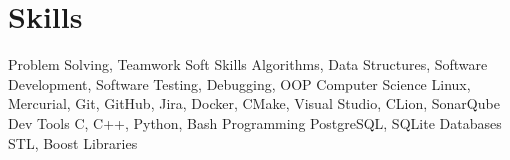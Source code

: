 \section{Skills}

\begin{itemize}
    \cventryii
        {Problem Solving, Teamwork}
        {Soft Skills}
    \cventryii
        {Algorithms, Data Structures, Software Development, Software Testing, Debugging, OOP}
        {Computer Science}
    \cventryii
        {Linux, Mercurial, Git, GitHub, Jira, Docker, CMake, Visual Studio, CLion, SonarQube}
        {Dev Tools}
    \cventryii
        {C, C++, Python, Bash}
        {Programming}
    \cventryii
        {PostgreSQL, SQLite}
        {Databases}
    \cventryii
        {STL, Boost}
        {Libraries}
\end{itemize}
